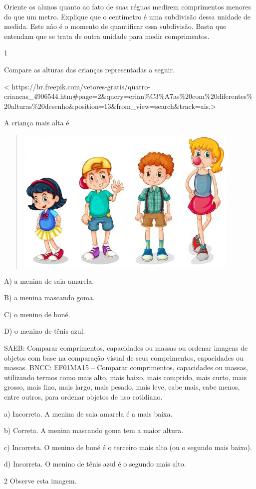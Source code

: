 {Oriente os alunos quanto ao fato de suas réguas medirem
comprimentos menores do que um metro. Explique que o centímetro
é uma subdivisão dessa unidade de medida. Este não é o momento de quantificar essa subdivisão.
Basta que entendam que se trata de outra unidade para medir
comprimentos.


\num{1}

Compare as alturas das crianças representadas a seguir.

\textless{}
https://br.freepik.com/vetores-gratis/quatro-criancas\_4906544.htm\#page=2\&query=crian\%C3\%A7as\%20com\%20diferentes\%20alturas\%20desenho\&position=13\&from\_view=search\&track=ais.\textgreater{}

A criança mais alta é

\begin{quote}
\includegraphics[width=4.23198in,height=2.75148in]{media/image32.jpg}
\end{quote}

A) a menina de saia amarela.

B) a menina mascando goma.

C) o menino de boné.

D) o menino de tênis azul.

SAEB: Comparar comprimentos, capacidades ou massas ou ordenar
imagens de objetos com base na comparação visual de seus comprimentos,
capacidades ou massas.
BNCC: EF01MA15 -- Comparar comprimentos, capacidades ou massas,
utilizando termos como mais alto, mais baixo, mais comprido, mais curto,
mais grosso, mais fino, mais largo, mais pesado, mais leve, cabe mais,
cabe menos, entre outros, para ordenar objetos de uso cotidiano.

a) Incorreta. A menina de saia amarela é a mais baixa.

b) Correta. A menina mascando goma tem a maior altura.

c) Incorreta. O menino de boné é o terceiro mais alto (ou o segundo mais
baixo).

d) Incorreta. O menino de tênis azul é o segundo mais alto.

\num{2} Observe esta imagem.}\label{section-37}

